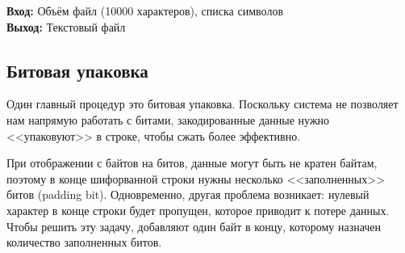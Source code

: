 \documentclass[12pt]{article} %
\begin{document}
\noindent \textbf{Вход: } Объём файл (10000 характеров), списка символов\\
\textbf{Выход: }  Текстовый файл \\

\subsection{Битовая упаковка}
Один главный процедур это битовая упаковка. Поскольку система не позволяет нам напрямую работать с битами, закодированные данные нужно <<упаковуют>> в строке, чтобы сжать более эффективно. 

При отображении с байтов на битов, данные могут быть не кратен байтам, поэтому в конце шифорванной строки нужны несколько <<заполненных>> битов (padding bit). Одновременно, другая проблема возникает: нулевый характер в конце строки будет пропущен, которое приводит к потере данных. Чтобы решить эту задачу, добавляют один байт в концу, которому назначен количество заполненных битов. 
\end{document}
